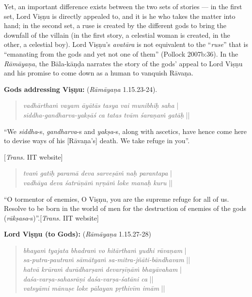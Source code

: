Yet, an important difference exists between the two sets of stories --- in the first set, Lord Viṣṇu is directly appealed to, and it is he who takes the matter into hand; in the second set, a ruse is created by the different gods to bring the downfall of the villain (in the first story, a celestial woman is created, in the other, a celestial boy). Lord Viṣṇu’s {\sl avatāra} is not equivalent to the “{\sl ruse}” that is “emanating from the gods and yet not one of them” (Pollock 2007b:36). In the {\sl Rāmāyaṇa}, the Bāla-kāṇḍa narrates the story of the gods’ appeal to Lord Viṣṇu and his promise to come down as a human to vanquish Rāvaṇa. 

\smallskip
\textbf{Gods addressing Viṣṇu:} ({\sl Rāmāyaṇa} 1.15.23-24).\\[-20pt]
\begin{quote}
{{\sl vadhārthaṁ vayam āyātās tasya vai munibhiḥ saha}} |\\
{\sl siddha-gandharva-yakṣāś ca tatas tvām śaraṇaṁ gatāḥ} ||
\end{quote}

\begin{myquote}
“We {\sl siddha}-s, {\sl gandharva}-s and {\sl yakṣa}-s, along with ascetics, have hence come here to devise ways of his [Rāvaṇa’s] death. We take refuge in you”.

\hfill[{\sl Trans.} IIT website]
\end{myquote}
\begin{quote}
{{\sl tvaṁ gatiḥ paramā deva sarveṣāṁ naḥ parantapa}} |\\
{\sl vadhāya deva śatrūṇāṁ nṛṇāṁ loke manaḥ kuru} ||
\end{quote}

\begin{myquote}
“O tormentor of enemies, O Viṣṇu, you are the supreme refuge for all of us. Resolve to be born in the world of men for the destruction of enemies of the gods ({\sl rākṣasa}-s)”.\hfill [{\sl Trans.} IIT website]
\end{myquote}

\smallskip
\textbf{Lord Viṣṇu (to Gods):} ({\sl Rāmāyaṇa} 1.15.27-28)\\[-20pt]

\begin{quote}
{{\sl bhayaṁ tyajata bhadraṁ vo hitārthaṁ yudhi rāvaṇam}} |\\
{\sl sa-putra-pautraṁ sāmātyaṁ sa-mitra-jñāti-bāndhavam} ||\\
{\sl hatvā krūraṁ durādharṣaṁ devarṣīṇāṁ bhayāvaham} |\\
{\sl daśa-varṣa-sahasrāṇi daśa-varṣa-śatāni ca} ||\\
{\sl vatsyāmi mānuṣe loke pālayan pṛthivīm imām} ||
\end{quote}

